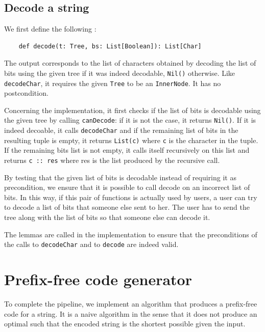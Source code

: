 \documentclass[a4paper,UKenglish,cleveref, autoref, thm-restate]{lipics-v2021}
\begin{document}
\subsection{Decode a string}
We first define the following :

\begin{lstlisting}
    def decode(t: Tree, bs: List[Boolean]): List[Char]
\end{lstlisting}

The output corresponds to the list of characters obtained by decoding the list of bits using the given tree if it was indeed decodable, \lstinline{Nil()} otherwise.
Like \lstinline{decodeChar}, it requires the given \lstinline{Tree} to be an \lstinline{InnerNode}. It has no postcondition. 

Concerning the implementation, it first checks if the list of bits is decodable using the given tree by calling \lstinline{canDecode}: if it is not the case, it returns \lstinline{Nil()}. 
If it is indeed decoable, it calls \lstinline{decodeChar} and if the remaining list of bits in the resulting tuple is empty, it returns \lstinline{List(c)} where \lstinline{c} is the character in the tuple. If the remaining bits list is not empty,
it calls itself recursively on this list and returns \lstinline{c :: res} where res is the list produced by the recursive call.

By testing that the given list of bits is decodable instead of requiring it as precondition, we ensure that it is possible to call decode on an incorrect list of bits. 
In this way, if this pair of functions is actually used by users, a user can try to decode a list of bits that someone else sent to her. The user has to send the tree along with the list of bits so that someone else can decode it.

The lemmas are called in the implementation to ensure that the preconditions of the calls to \lstinline{decodeChar} and to \lstinline{decode} are indeed valid.

\section{Prefix-free code generator} 
To complete the pipeline, we implement an algorithm that produces a prefix-free code for a string. It is a naive algorithm in the sense that it does not produce an optimal such that the encoded string is the shortest possible given the input.
\end{document}
